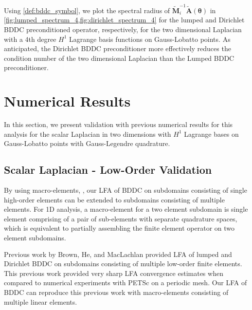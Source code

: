 \documentclass[review]{siamart190516}
\begin{document}
Using \cref{def:bddc_symbol}, we plot the spectral radius of $\tilde{\mathbf{M}}^{-1}_i \tilde{\mathbf{A}} \left( \boldsymbol{\theta} \right)$ in \cref{fig:lumped_spectrum_4,fig:dirichlet_spectrum_4} for the lumped and Dirichlet BDDC preconditioned operator, respectively, for the two dimensional Laplacian with a 4th degree $H^1$ Lagrange basis functions on Gauss-Lobatto points.
As anticipated, the Dirichlet BDDC preconditioner more effectively reduces the condition number of the two dimensional Laplacian than the Lumped BDDC preconditioner.

\section{Numerical Results}\label{sec:results}

In this section, we present validation with previous numerical results for this analysis for the scalar Laplacian in two dimensions with $H^1$ Lagrange bases on Gauss-Lobatto points with Gauss-Legendre quadrature.

\subsection{Scalar Laplacian - Low-Order Validation}\label{sec:lowordervalidate}

By using macro-elements, \cite{kumar2019local, brown2019local}, our LFA of BDDC on subdomains consisting of single high-order elements can be extended to subdomains consisting of multiple elements.
For 1D analysis, a macro-element for a two element subdomain is single element comprising of a pair of sub-elements with separate quadrature spaces, which is equivalent to partially assembling the finite element operator on two element subdomains.

Previous work by Brown, He, and MacLachlan \cite{brown2019local} provided LFA of lumped and Dirichlet BDDC on subdomains consisting of multiple low-order finite elements.
This previous work provided very sharp LFA convergence estimates when compared to numerical experiments with PETSc \cite{petsc-user-ref} on a periodic mesh.
Our LFA of BDDC can reproduce this previous work with macro-elements consisting of multiple linear elements.
\end{document}
